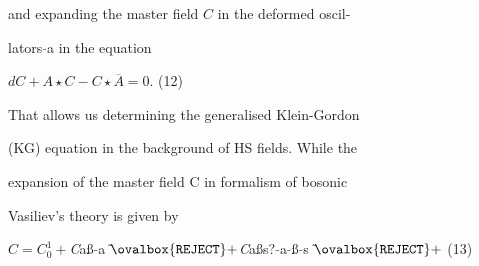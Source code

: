 \documentclass[a4paper,12pt]{article}
\begin{document}
and expanding the master field $C$ in the deformed oscil-

lators $\tilde{}$a in the equation
\begin{center}
$dC+A\star C-C\star\overline{A}=0$.   (12)
\end{center}
That allows us determining the generalised Klein-Gordon

(KG) equation in the background of HS fields. While the

expansion of the master field $\mathrm{C}$ in formalism of bosonic

Vasiliev’s theory is given by

$C=C_{0}^{1} +${\it C}aß $\tilde{}$a $\tilde{}\ovalbox{\tt\small REJECT}+${\it C}aßs? $\tilde{}$a $\tilde{}$ß $\tilde{}$s $\tilde{}\ovalbox{\tt\small REJECT}+$ (13)
\end{document}
